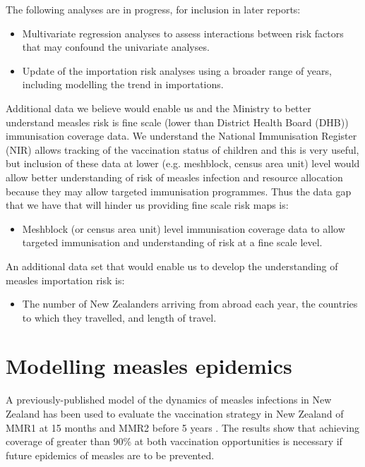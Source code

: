 \documentclass{article}
\begin{document}
The following analyses are in progress, for inclusion in later reports:
\begin{itemize}
\item Multivariate regression analyses to assess interactions between risk factors that may confound the univariate analyses.
\item Update of the importation risk analyses using a broader range of years, including modelling the trend in importations.
\end{itemize}
Additional data we believe would enable us and the Ministry to better understand measles risk is fine scale (lower than District Health Board (DHB)) immunisation coverage data. We understand the National Immunisation Register (NIR) allows tracking of the vaccination status of children and this is very useful, but inclusion of these data at lower (e.g. meshblock, census area unit) level would allow better understanding of risk of measles infection and resource allocation because they may allow targeted immunisation programmes. Thus the data gap that we have that will hinder us providing fine scale risk maps is:
\begin{itemize}
\item Meshblock (or census area unit) level immunisation coverage data to allow targeted immunisation and understanding of risk at a fine scale level.
\end {itemize}
An additional data set that would enable us to develop the understanding of measles importation risk is:
\begin {itemize}
\item The number of New Zealanders arriving from abroad each year, the countries to which they travelled, and length of travel.
\end{itemize}


\section{Modelling measles epidemics}
\label{sec:epidemic_modelling}

A previously-published model of the dynamics of measles infections in New Zealand has been used to evaluate the vaccination strategy in New Zealand of MMR1 at 15 months and MMR2 before 5 years \citep{roberts0,roberts4,tobias98}. The results show that achieving coverage of greater than 90\% at both vaccination opportunities is necessary if future epidemics of measles are to be prevented.
\end{document}
